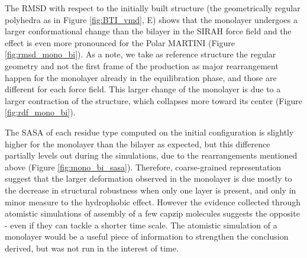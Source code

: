 The RMSD with respect to the initially built structure (the geometrically regular polyhedra as in Figure \ref{fig:BTI_vmd}, E) shows that the monolayer undergoes a larger conformational change than the bilayer in the SIRAH force field and the effect is even more pronounced for the Polar MARTINI (Figure \ref{fig:rmsd_mono_bi}). 
%
As a note, we take as reference structure the regular geometry and not the first frame of the production as major rearrangement happen for the monolayer already in the equilibration phase, and those are different for each force field.
%
This larger change of the monolayer is due to a larger contraction of the structure, which collapses more toward its center (Figure \ref{fig:rdf_mono_bi}).
%
%

The SASA of each residue type computed on the initial configuration is slightly higher for the monolayer than the bilayer as expected, but this difference partially levels out during the simulations, due to the rearrangements mentioned above (Figure \ref{fig:mono_bi_sasa}). Therefore, coarse-grained representation suggest that the larger deformation observed in the monolayer is due mostly to the decrease in structural robustness when only one layer is present, and only in minor measure to the hydrophobic effect.
%
However the evidence collected through atomistic simulations of assembly of a few capzip molecules suggests the opposite - even if they can tackle a shorter time scale.
The atomistic simulation of a monolayer would be a useful piece of information to strengthen the conclusion derived, but was not run in the interest of time.

